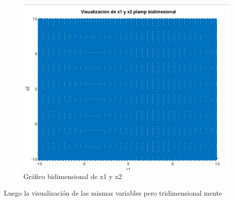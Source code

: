 \documentclass[12pt,letterpaper]{article}
\begin{document}
\begin{figure}[H]
    \centering
    \includegraphics[scale=0.55]{A&A_GAF_HW01/fig/A&A_HW01_04.png}
    \caption{Gráfico bidimensional de x1 y x2   }
    \label{fig:MV4}
\end{figure}
Luego la visualización de las mismas variables pero tridimensional mente
\end{document}
